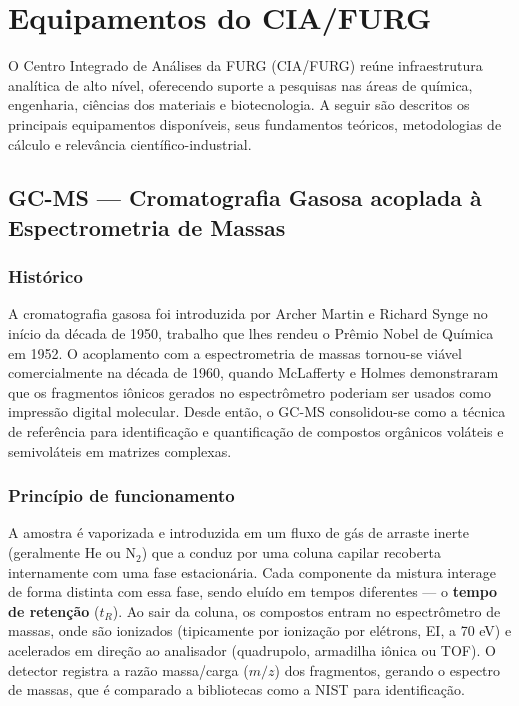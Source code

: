 
\section{Equipamentos do CIA/FURG}

O Centro Integrado de Análises da FURG (CIA/FURG) reúne infraestrutura
analítica de alto nível, oferecendo suporte a pesquisas nas áreas de
química, engenharia, ciências dos materiais e biotecnologia. A seguir
são descritos os principais equipamentos disponíveis, seus fundamentos
teóricos, metodologias de cálculo e relevância científico-industrial.

\subsection{GC-MS --- Cromatografia Gasosa acoplada à Espectrometria de Massas}

\subsubsection*{Histórico}

A cromatografia gasosa foi introduzida por Archer Martin e Richard Synge
no início da década de 1950, trabalho que lhes rendeu o Prêmio Nobel de
Química em 1952. O acoplamento com a espectrometria de massas tornou-se
viável comercialmente na década de 1960, quando McLafferty e Holmes
demonstraram que os fragmentos iônicos gerados no espectrômetro poderiam
ser usados como impressão digital molecular. Desde então, o GC-MS
consolidou-se como a técnica de referência para identificação e
quantificação de compostos orgânicos voláteis e semivoláteis em matrizes
complexas.

\subsubsection*{Princípio de funcionamento}

A amostra é vaporizada e introduzida em um fluxo de gás de arraste inerte
(geralmente He ou $\text{N}_2$) que a conduz por uma coluna capilar
recoberta internamente com uma fase estacionária. Cada componente da
mistura interage de forma distinta com essa fase, sendo eluído em tempos
diferentes --- o \textbf{tempo de retenção} ($t_R$). Ao sair da coluna, os
compostos entram no espectrômetro de massas, onde são ionizados
(tipicamente por ionização por elétrons, EI, a 70 eV) e acelerados em
direção ao analisador (quadrupolo, armadilha iônica ou TOF). O detector
registra a razão massa/carga ($m/z$) dos fragmentos, gerando o espectro de
massas, que é comparado a bibliotecas como a NIST para identificação.

